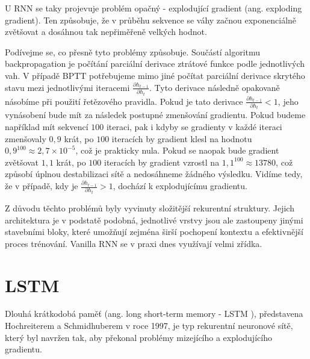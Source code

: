 U RNN se taky projevuje problém opačný - explodující gradient (ang. exploding
gradient). Ten způsobuje, že v průběhu sekvence se váhy začnou exponenciálně
zvětšovat a dosáhnou tak nepřiměřeně velkých hodnot.

Podívejme se, co přesně tyto problémy způsobuje. Součástí algoritmu
backpropagation je počítání parciální derivace ztrátové funkce podle
jednotlivých vah. V případě BPTT potřebujeme mimo jiné počítat parciální
derivace skrytého stavu mezi jednotlivými iteracemi $\frac{\partial
        h_{t-1}}{\partial h_t}$. Tyto derivace následně opakovaně násobíme při použití
řetězového pravidla. Pokud je tato derivace $\frac{\partial h_{t-1}}{\partial
        h_t}<1$, jeho vynásobení bude mít za následek postupné zmenšování gradientu.
Pokud budeme například mít sekvencí $100$ iteraci, pak i kdyby se gradienty v
každé iteraci zmenšovaly $0,9$ krát, po $100$ iteracích by gradient klesl na
hodnotu $0,9^{100} \approx 2,7 \times 10^{-5}$, což je prakticky nula. Pokud se
naopak bude gradient zvětšovat $1,1$ krát, po $100$ iteracích by gradient
vzrostl na $1,1^{100} \approx 13 780$, což způsobí úplnou destabilizaci sítě a
nedosáhneme žádného výsledku. Vidíme tedy, že v případě, kdy je $\frac{\partial
        h_{t-1}}{\partial h_t}>1$, dochází k explodujícímu gradientu.

Z důvodu těchto problémů byly vyvinuty složitější rekurentní struktury. Jejich
architektura je v podstatě podobná, jednotlivé vrstvy jsou ale zastoupeny
jinými stavebními bloky, které umožňují zejména širší pochopení kontextu a
efektivnější proces trénování. Vanilla RNN se v praxi dnes využívají velmi
zřídka.

\section{LSTM}

Dlouhá krátkodobá paměť (ang. long short-term memory - LSTM ), představena
Hochreiterem a Schmidhuberem v roce 1997, je typ rekurentní neuronové sítě,
který byl navržen tak, aby překonal problémy mizejícího a explodujícího
gradientu.

